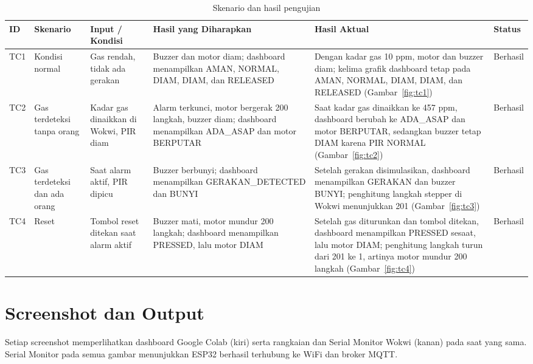 \documentclass[12pt,a4paper,oneside]{report}
\newcommand{\tablesize}{\small}
\begin{document}
\begin{table}[H]
  \caption{Skenario dan hasil pengujian}
  \label{tab:uji}
  \renewcommand{\tablesize}{\footnotesize}  %
  \begin{tabularx}{\textwidth}{P{0.9cm} P{1.7cm} P{2cm} L L P{1.5cm}}
    \toprule
    \textbf{ID} & \textbf{Skenario} & \textbf{Input / Kondisi} & \textbf{Hasil yang Diharapkan} & \textbf{Hasil Aktual} & \textbf{Status} \\
    \midrule
    TC1 & Kondisi normal & Gas rendah, tidak ada gerakan & Buzzer dan motor diam; dashboard menampilkan AMAN, NORMAL, DIAM, DIAM, dan RELEASED & Dengan kadar gas 10 ppm, motor dan buzzer diam; kelima grafik dashboard tetap pada AMAN, NORMAL, DIAM, DIAM, dan RELEASED (Gambar~\ref{fig:tc1}) & Berhasil \\
    TC2 & Gas terdeteksi tanpa orang & Kadar gas dinaikkan di Wokwi, PIR diam & Alarm terkunci, motor bergerak 200 langkah, buzzer diam; dashboard menampilkan ADA\_ASAP dan motor BERPUTAR & Saat kadar gas dinaikkan ke 457 ppm, dashboard berubah ke ADA\_ASAP dan motor BERPUTAR, sedangkan buzzer tetap DIAM karena PIR NORMAL (Gambar~\ref{fig:tc2}) & Berhasil \\
    TC3 & Gas terdeteksi dan ada orang & Saat alarm aktif, PIR dipicu & Buzzer berbunyi; dashboard menampilkan GERAKAN\_\allowbreak DETECTED dan BUNYI & Setelah gerakan disimulasikan, dashboard menampilkan GERAKAN dan buzzer BUNYI; penghitung langkah stepper di Wokwi menunjukkan 201 (Gambar~\ref{fig:tc3}) & Berhasil \\
    TC4 & Reset & Tombol reset ditekan saat alarm aktif & Buzzer mati, motor mundur 200 langkah; dashboard menampilkan PRESSED, lalu motor DIAM & Setelah gas diturunkan dan tombol ditekan, dashboard menampilkan PRESSED sesaat, lalu motor DIAM; penghitung langkah turun dari 201 ke 1, artinya motor mundur 200 langkah (Gambar~\ref{fig:tc4}) & Berhasil \\
    \bottomrule
  \end{tabularx}
\end{table}

\section{Screenshot dan Output}
Setiap screenshot memperlihatkan dashboard Google Colab (kiri) serta rangkaian dan Serial Monitor Wokwi (kanan) pada saat yang sama. Serial Monitor pada semua gambar menunjukkan ESP32 berhasil terhubung ke WiFi dan broker MQTT.
\end{document}
